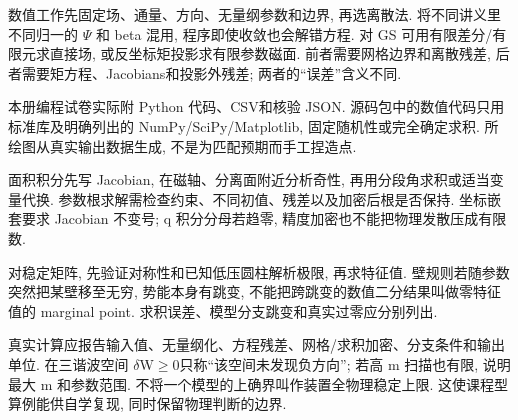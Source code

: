 \label{ch:numerics}
数值工作先固定场、通量、方向、无量纲参数和边界, 再选离散法. 将不同讲义里不同归一的 \ensuremath{\Psi} 和 beta 混用, 程序即使收敛也会解错方程. 对 GS 可用有限差分/有限元求直接场, 或反坐标矩投影求有限参数磁面. 前者需要网格边界和离散残差, 后者需要矩方程、Jacobians和投影外残差; 两者的``误差''含义不同.

本册编程试卷实际附 Python 代码、CSV和核验 JSON. 源码包中的数值代码只用标准库及明确列出的 NumPy/SciPy/Matplotlib, 固定随机性或完全确定求积. 所绘图从真实输出数据生成, 不是为匹配预期而手工捏造点.

面积积分先写 Jacobian, 在磁轴、分离面附近分析奇性, 再用分段角求积或适当变量代换. 参数根求解需检查约束、不同初值、残差以及加密后根是否保持. 坐标嵌套要求 Jacobian 不变号; q 积分分母若趋零, 精度加密也不能把物理发散压成有限数.

对稳定矩阵, 先验证对称性和已知低压圆柱解析极限, 再求特征值. 壁规则若随参数突然把某壁移至无穷, 势能本身有跳变, 不能把跨跳变的数值二分结果叫做零特征值的 marginal point. 求积误差、模型分支跳变和真实过零应分别列出.

真实计算应报告输入值、无量纲化、方程残差、网格/求积加密、分支条件和输出单位. 在三谐波空间 \ensuremath{\delta}W\ensuremath{\ge}0只称``该空间未发现负方向''; 若高 m 扫描也有限, 说明最大 m 和参数范围. 不将一个模型的上确界叫作装置全物理稳定上限. 这使课程型算例能供自学复现, 同时保留物理判断的边界.
